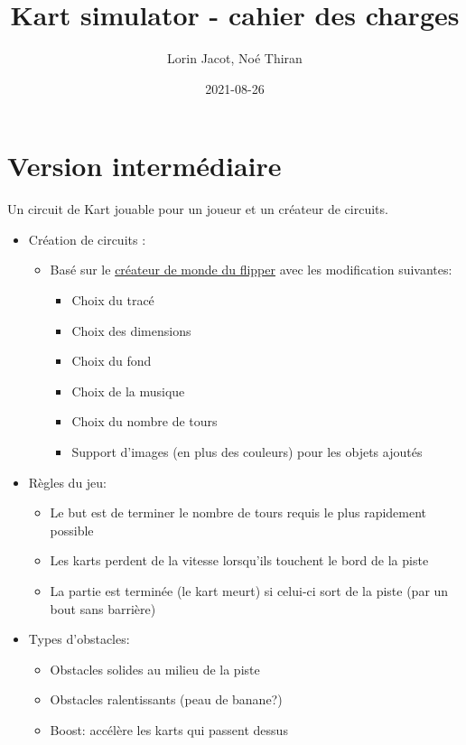 \documentclass{article}
\title{Kart simulator - cahier des charges}
\date{2021-08-26}
\author{Lorin Jacot, Noé Thiran}
\begin{document}
\maketitle

\section{Version intermédiaire}

Un circuit de Kart jouable pour un joueur et un créateur de circuits.

\begin{itemize}
    \item Création de circuits :
          \begin{itemize}
              \item Basé sur le \href{https://lj44.ch/creator/flipper}{créateur de monde du flipper} avec les modification suivantes: \begin{itemize}
                        \item Choix du tracé
                        \item Choix des dimensions
                        \item Choix du fond
                        \item Choix de la musique
                        \item Choix du nombre de tours
                        \item Support d'images (en plus des couleurs) pour les objets ajoutés
                    \end{itemize}
          \end{itemize}
    \item Règles du jeu: \begin{itemize}
        \item Le but est de terminer le nombre de tours requis le plus rapidement possible
        \item Les karts perdent de la vitesse lorsqu'ils touchent le bord de la piste
        \item La partie est terminée (le kart meurt) si celui-ci sort de la piste (par un bout sans barrière)
    \end{itemize}
    \item Types d'obstacles:\begin{itemize}
        \item Obstacles solides au milieu de la piste
        \item Obstacles ralentissants (peau de banane?)
        \item Boost: accélère les karts qui passent dessus

\end{itemize}
\end{itemize}
\end{document}
